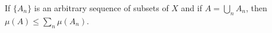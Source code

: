 If $\{A_n\}$ is an arbitrary sequence of subsets of $X$ and if $A = \bigcup_n A_n$, then $\mu(A) \leq \sum_n \mu(A_n)$.
